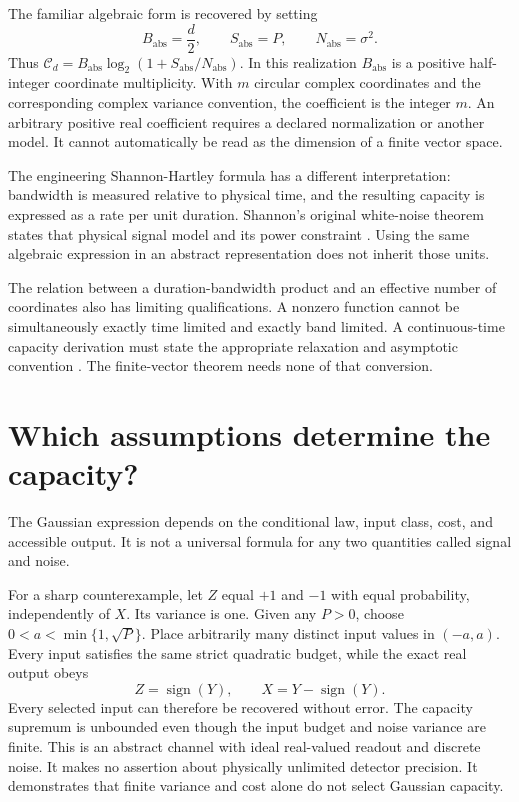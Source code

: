 \documentclass{article}
\begin{document}
The familiar algebraic form is recovered by setting
\[
B_{\mathrm{abs}}=\frac d2,\qquad S_{\mathrm{abs}}=P,
\qquad N_{\mathrm{abs}}=\sigma^2.
\]
Thus \(\mathcal C_d=B_{\mathrm{abs}}\log_2(1+S_{\mathrm{abs}}/N_{\mathrm{abs}})\). In this realization \(B_{\mathrm{abs}}\) is a positive half-integer coordinate multiplicity. With \(m\) circular complex coordinates and the corresponding complex variance convention, the coefficient is the integer \(m\). An arbitrary positive real coefficient requires a declared normalization or another model. It cannot automatically be read as the dimension of a finite vector space.

The engineering Shannon-Hartley formula has a different interpretation: bandwidth is measured relative to physical time, and the resulting capacity is expressed as a rate per unit duration. Shannon's original white-noise theorem states that physical signal model and its power constraint \cite{shannon}. Using the same algebraic expression in an abstract representation does not inherit those units.

The relation between a duration-bandwidth product and an effective number of coordinates also has limiting qualifications. A nonzero function cannot be simultaneously exactly time limited and exactly band limited. A continuous-time capacity derivation must state the appropriate relaxation and asymptotic convention \cite{polyanskiy19}. The finite-vector theorem needs none of that conversion.

\section{Which assumptions determine the capacity?}
The Gaussian expression depends on the conditional law, input class, cost, and accessible output. It is not a universal formula for any two quantities called signal and noise.

For a sharp counterexample, let \(Z\) equal \(+1\) and \(-1\) with equal probability, independently of \(X\). Its variance is one. Given any \(P>0\), choose \(0<a<\min\{1,\sqrt P\}\). Place arbitrarily many distinct input values in \((-a,a)\). Every input satisfies the same strict quadratic budget, while the exact real output obeys
\[
Z=\operatorname{sign}(Y),\qquad
X=Y-\operatorname{sign}(Y).
\]
Every selected input can therefore be recovered without error. The capacity supremum is unbounded even though the input budget and noise variance are finite. This is an abstract channel with ideal real-valued readout and discrete noise. It makes no assertion about physically unlimited detector precision. It demonstrates that finite variance and cost alone do not select Gaussian capacity.
\end{document}

